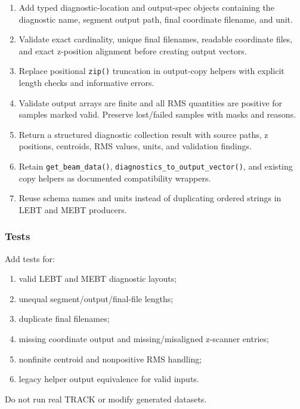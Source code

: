 \documentclass[
]{article}
\providecommand{\tightlist}{%
  \setlength{\itemsep}{0pt}\setlength{\parskip}{0pt}}
\begin{document}
\begin{enumerate}
\def\labelenumi{\arabic{enumi}.}
\tightlist
\item
  Add typed diagnostic-location and output-spec objects containing the
  diagnostic name, segment output path, final coordinate filename, and
  unit.
\item
  Validate exact cardinality, unique final filenames, readable
  coordinate files, and exact z-position alignment before creating
  output vectors.
\item
  Replace positional \texttt{zip()} truncation in output-copy helpers
  with explicit length checks and informative errors.
\item
  Validate output arrays are finite and all RMS quantities are positive
  for samples marked valid. Preserve lost/failed samples with masks and
  reasons.
\item
  Return a structured diagnostic collection result with source paths, z
  positions, centroids, RMS values, units, and validation findings.
\item
  Retain \texttt{get\_beam\_data()},
  \texttt{diagnostics\_to\_output\_vector()}, and existing copy helpers
  as documented compatibility wrappers.
\item
  Reuse schema names and units instead of duplicating ordered strings in
  LEBT and MEBT producers.
\end{enumerate}

\hypertarget{tests-6}{%
\subsubsection{Tests}\label{tests-6}}

Add tests for:

\begin{enumerate}
\def\labelenumi{\arabic{enumi}.}
\tightlist
\item
  valid LEBT and MEBT diagnostic layouts;
\item
  unequal segment/output/final-file lengths;
\item
  duplicate final filenames;
\item
  missing coordinate output and missing/misaligned z-scanner entries;
\item
  nonfinite centroid and nonpositive RMS handling;
\item
  legacy helper output equivalence for valid inputs.
\end{enumerate}

Do not run real TRACK or modify generated datasets.
\end{document}
